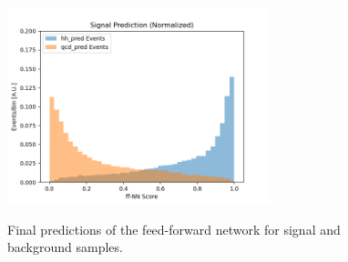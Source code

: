 \begin{figure}[!h] 
\begin{center}
   \includegraphics[width = 3in]{ffNN/figures/score_ffnn_v3}\\
\caption{Final predictions of the feed-forward network for signal and background samples.}
  \label{fig:results_nn}
\end{center}
\end{figure}

